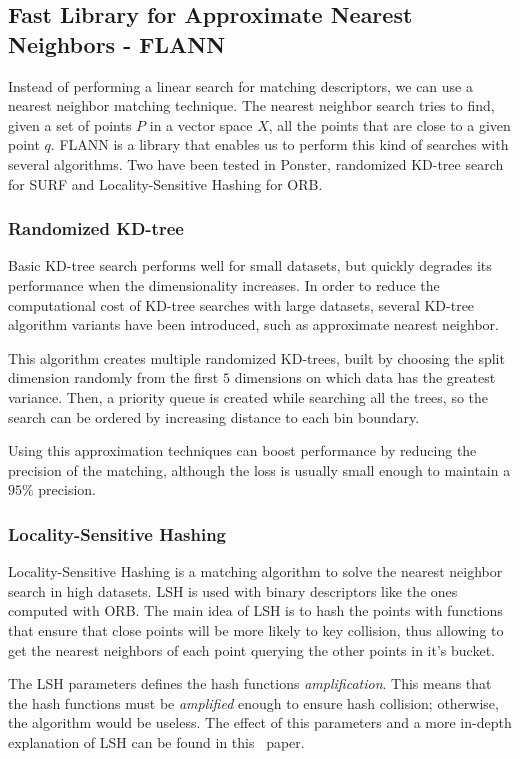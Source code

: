 \subsection{Fast Library for Approximate Nearest Neighbors - FLANN}
Instead of performing a linear search for matching descriptors, we can use a
nearest neighbor matching technique. The nearest neighbor search tries to
find, given a set of points $P$ in a vector space $X$, all the points that are 
close to a given point $q$. FLANN\cite{muja:fast}
is a library that enables us to perform this
kind of searches with several algorithms. Two have been tested in Ponster,
randomized KD-tree search for SURF and Locality-Sensitive Hashing for ORB.

\subsubsection{Randomized KD-tree}
Basic KD-tree search performs well for small datasets, but quickly degrades
its performance when the dimensionality increases. In order
to reduce the computational cost of KD-tree searches with large datasets, several
KD-tree algorithm variants have been introduced, such as approximate nearest
neighbor. 

This algorithm creates multiple randomized KD-trees, built by choosing the
split dimension randomly from the first $5$ dimensions on which data has the
greatest variance. Then, a priority queue is created while searching all the
trees, so the search can be ordered by increasing distance to each bin
boundary. 

Using this approximation techniques can boost performance by reducing the
precision of the matching, although the loss is usually small enough to maintain
a $95\%$ precision. 

\subsubsection{Locality-Sensitive Hashing}
Locality-Sensitive Hashing is a matching algorithm to solve the nearest
neighbor search in high datasets. LSH is used with binary descriptors like the
ones computed with ORB. The main idea of LSH is to hash the points with
functions that ensure that close points will be more likely to key collision,
thus allowing to get the nearest neighbors of each point querying the other
points in it's bucket\cite{Andoni:2008:NHA:1327452.1327494}.

The LSH parameters defines the hash functions \emph{amplification}. This means that
the hash functions must be \emph{amplified} enough to ensure hash collision;
otherwise, the algorithm would be useless. The effect of this parameters and a more
in-depth explanation of LSH can be found in
this~\cite{Andoni:2008:NHA:1327452.1327494} paper. 


